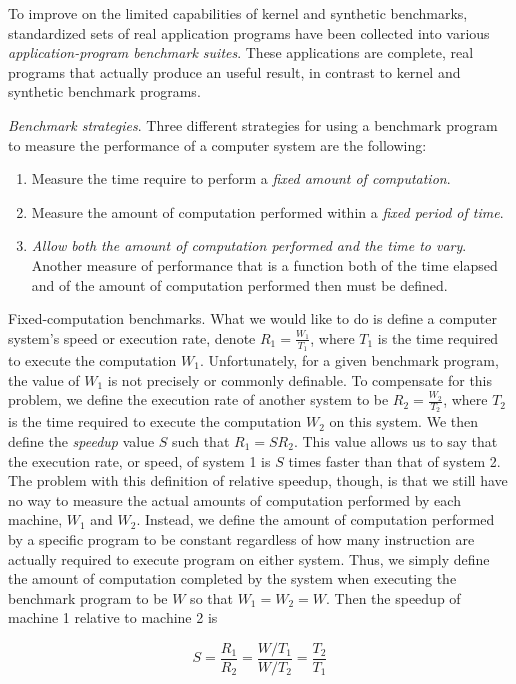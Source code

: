 \documentclass[openany, a4paper]{book}
\theoremstyle{plain}
\theoremstyle{definition}
\theoremstyle{remark}
\begin{document}
To improve on the limited capabilities of kernel and synthetic benchmarks,
standardized sets of real application programs have been collected into
various \emph{application-program benchmark suites}. These applications are
complete, real programs that actually produce an useful result, in contrast
to kernel and synthetic benchmark programs.

\emph{Benchmark strategies}. Three different strategies for using a benchmark
program to measure the performance of a computer system are the following:

\begin{enumerate}
\item Measure the time require to perform a \emph{fixed amount of computation}.
\item Measure the amount of computation performed within a \emph{fixed period of
time}.
\item \emph{Allow both the amount of computation performed and the time to
vary}. Another measure of performance that is a function both of the time
elapsed and of the amount of computation performed then must be defined.
\end{enumerate}


Fixed-computation benchmarks. What we would like to do is define a computer
system's speed or execution rate, denote \(R_1 = \frac{W_1}{T_1}\), where
\(T_1\) is the time required to execute the computation
\(W_1\). Unfortunately, for a given benchmark program, the value of \(W_1\)
is not precisely or commonly definable. To compensate for this problem, we
define the execution rate of another system to be \(R_2 = \frac{W_2}{T_2}\),
where \(T_2\) is the time required to execute the computation \(W_2\) on
this system. We then define the \emph{speedup} value \(S\) such that \(R_1 =
    SR_2\). This value allows us to say that the execution rate, or speed, of
system 1 is \(S\) times faster than that of system 2.
The problem with this definition of relative speedup, though, is that we
still have no way to measure the actual amounts of computation performed by
each machine, \(W_1\) and \(W_2\). Instead, we define the amount of
computation performed by a specific program to be constant regardless of how
many instruction are actually required to execute program on either
system. Thus, we simply define the amount of computation completed by the
system when executing the benchmark program to be \(W\) so  that \(W_1 =
    W_2 = W\). Then the speedup of machine 1 relative to machine 2 is

\begin{equation}
  S = \frac{R_1}{R_2} = \frac{W/T_1}{W/T_2} = \frac{T_2}{T_1}
\end{equation}
\end{document}
